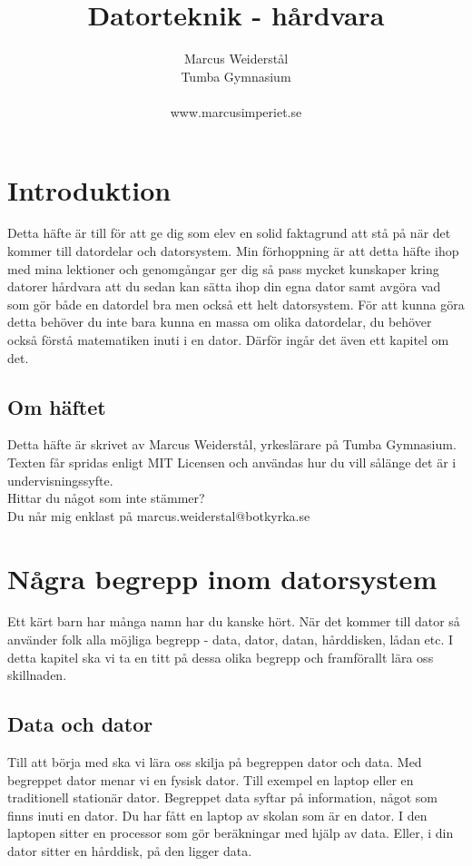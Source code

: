 \documentclass[12pt, letterpaper]{report}
\title{Datorteknik - hårdvara}
\author{Marcus Weiderstål \\ Tumba Gymnasium \\ \\ www.marcusimperiet.se}
\date{}
\begin{document}
\begin{titlepage}
\maketitle
\end{titlepage}

\tableofcontents{}
\chapter{Introduktion}
Detta häfte är till för att ge dig som elev en solid faktagrund att stå på när det kommer till datordelar och datorsystem. Min förhoppning är att detta häfte ihop med mina lektioner och genomgångar ger dig så pass mycket kunskaper kring datorer hårdvara att du sedan kan sätta ihop din egna dator samt avgöra vad som gör både en datordel bra men också ett helt datorsystem. För att kunna göra detta behöver du inte bara kunna en massa om olika datordelar, du behöver också förstå matematiken inuti i en dator. Därför ingår det även ett kapitel om det.

\section{Om häftet}
Detta häfte är skrivet av Marcus Weiderstål, yrkeslärare på Tumba Gymnasium. Texten får spridas enligt MIT Licensen och användas hur du vill sålänge det är i undervisningssyfte.\\Hittar du något som inte stämmer?\\ Du når mig enklast på  marcus.weiderstal@botkyrka.se
\newpage 

\chapter{Några begrepp inom datorsystem}
Ett kärt barn har många namn har du kanske hört. När det kommer till dator så använder folk alla möjliga begrepp - data, dator, datan, hårddisken, lådan etc. I detta kapitel ska vi ta en titt på dessa olika begrepp och framförallt lära oss skillnaden.

\section{Data och dator}
Till att börja med ska vi lära oss skilja på begreppen dator och data. Med begreppet dator menar vi en fysisk dator. Till exempel en laptop eller en traditionell stationär dator. Begreppet data syftar på information, något som finns inuti en dator. Du har fått en laptop av skolan som är en dator. I den laptopen sitter en processor som gör beräkningar med hjälp av data. Eller, i din dator sitter en hårddisk, på den ligger data. 
\end{document}

